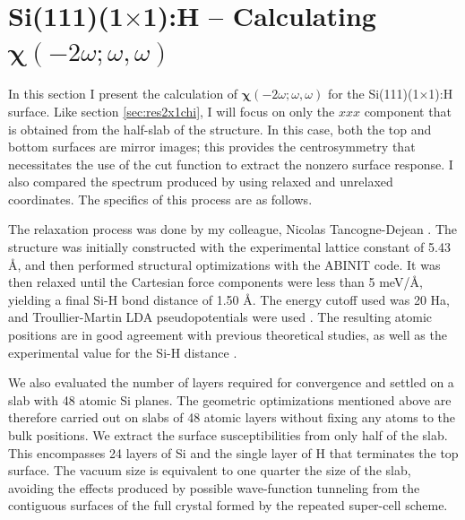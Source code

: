 \documentclass[11pt]{book}
\begin{document}

\section{\texorpdfstring{Si(111)(1$\times$1):H}{Si(111)(1x1):H} -- Calculating 
\texorpdfstring{$\boldsymbol{\chi}(-2\omega;\omega,\omega)$}{X(-2w;w,w)}}
\label{sec:res1x1chi}

In this section I present the calculation of
$\boldsymbol{\chi}(-2\omega;\omega,\omega)$ for the Si(111)(1$\times$1):H
surface. Like section \ref{sec:res2x1chi}, I will focus on only the $xxx$
component that is obtained from the half-slab of the structure. In this case,
both the top and bottom surfaces are mirror images; this provides the
centrosymmetry that necessitates the use of the cut function to extract the
nonzero surface response. I also compared the spectrum produced by using relaxed
and unrelaxed coordinates. The specifics of this process are as follows.

The relaxation process was done by my colleague, Nicolas Tancogne-Dejean
\cite{tancognedejean:tel-01235611}. The structure was initially constructed with
the experimental lattice constant of 5.43 \AA, and then performed structural
optimizations with the ABINIT \cite{gonzeCPS09, abinit} code. It was then
relaxed until the Cartesian force components were less than 5 meV/\AA, yielding
a final Si-H bond distance of 1.50 \AA. The energy cutoff used was 20 Ha, and
Troullier-Martin LDA pseudopotentials were used \cite{troullierPRB91}. The
resulting atomic positions are in good agreement with previous theoretical
studies, \cite{kaxirasPRB88, jonaPRB95, alfonsoPRB96, cargnoniJOCP00,
mejiaPRB02} as well as the experimental value for the Si-H distance
\cite{weastCRC88}.

We also evaluated the number of layers required for convergence and settled on a slab with 48 atomic Si planes. The geometric optimizations mentioned above are therefore carried out on slabs of 48 atomic layers without fixing any atoms to the bulk positions. We extract the surface susceptibilities from only half of the slab. This encompasses 24 layers of Si and the single layer of H that terminates the top surface. The vacuum size is equivalent to one quarter the size of the slab, avoiding the effects produced by possible wave-function tunneling from the contiguous surfaces of the full crystal formed by the repeated super-cell scheme.\cite{mendozaPRB06}
\end{document}
